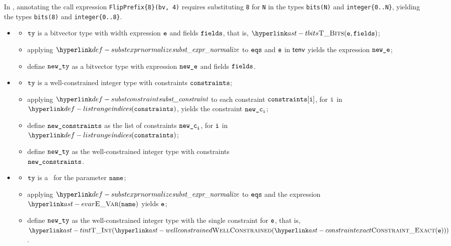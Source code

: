 In , annotating the call expression \verb|FlipPrefix{8}(bv, 4)|
requires substituting \verb|8| for \verb|N| in the types
\verb|bits(N)| and \verb|integer{0..N}|, yielding the types
\verb|bits(8)| and \verb|integer{0..8}|.

\ProseParagraph
\OneApplies
\begin{itemize}
  \item {}
  \begin{itemize}
    \item $\texttt{ty}$ is a bitvector type with width expression $\texttt{e}$ and fields $\texttt{fields}$, that is, $\TBits(\ve, \fields)$;
    \item applying $\substexprnormalize$ to $\texttt{eqs}$ and $\texttt{e}$ in $\textsf{tenv}$ yields the expression $\texttt{new\_e}$;
    \item define $\texttt{new\_ty}$ as a bitvector type with expression $\texttt{new\_e}$ and fields $\texttt{fields}$.
  \end{itemize}

  \item {}
  \begin{itemize}
    \item $\texttt{ty}$ is a well-constrained integer type with constraints $\texttt{constraints}$;
    \item applying $\substconstraint$ to each constraint $\texttt{constraints}[\texttt{i}]$, for $\texttt{i}$ in \\
          $\listrange(\constraints)$, yields the constraint $\texttt{new\_c}_{\texttt{i}}$;
    \item define $\texttt{new\_constraints}$ as the list of constraints $\texttt{new\_c}_{\texttt{i}}$, for $\texttt{i}$ in \\
          $\listrange(\constraints)$;
    \item define $\texttt{new\_ty}$ as the well-constrained integer type with constraints \\
          $\texttt{new\_constraints}$.
  \end{itemize}

  \item {}
  \begin{itemize}
    \item $\texttt{ty}$ is a \parameterizedintegertype\ for the parameter $\texttt{name}$;
    \item applying $\substexprnormalize$ to $\texttt{eqs}$ and the expression $\EVar(\name)$ yields $\texttt{e}$;
    \item define $\texttt{new\_ty}$ as the well-constrained integer type with the single constraint for $\texttt{e}$, that is,
          $\TInt(\wellconstrained(\ConstraintExact(\ve)))$.
  \end{itemize}


\end{itemize}
